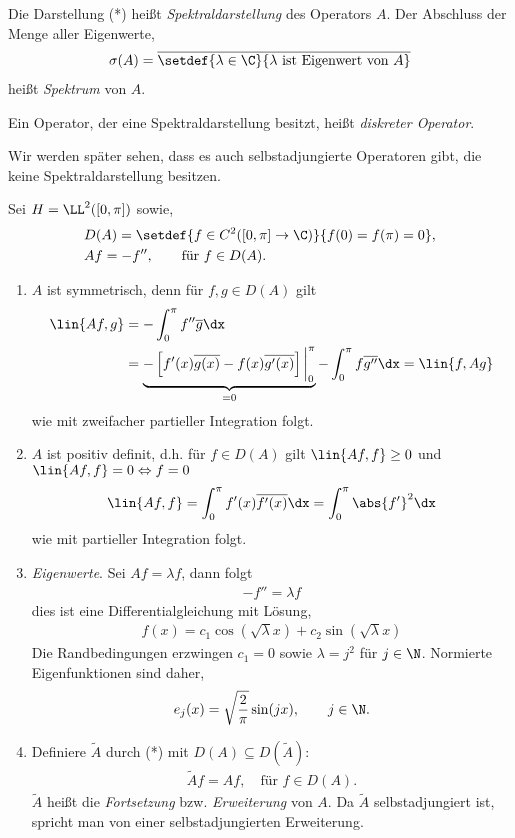 \begin{defn}
\label{defn:1.17}
Die Darstellung (*) heißt \emph{Spektraldarstellung} des Operators $A$. Der
Abschluss der Menge aller Eigenwerte,
\begin{align*}
\sigma(A) = \overline{\setdef{\lambda\in\C}{\lambda\text{ ist Eigenwert von }A}}
\end{align*}
heißt \emph{Spektrum} von $A$.

Ein Operator, der eine Spektraldarstellung besitzt, heißt \emph{diskreter
Operator}.\fishhere
\end{defn}

Wir werden später sehen, dass es auch selbstadjungierte Operatoren gibt, die
keine Spektraldarstellung besitzen.

\begin{bsp}
\label{bsp:1.18}
Sei $H=\LL^2([0,\pi])$ sowie,
\begin{align*}
&D(A) = \setdef{f\in C^2([0,\pi]\to\C)}{f(0) = f(\pi) = 0},\\
&Af = -f'',\qquad \text{für } f\in D(A).
\end{align*}
\begin{enumerate}[label=\arabic{*}.)]
  \item $A$ ist symmetrisch, denn für $f,g\in D(A)$ gilt
\begin{align*}
\lin{Af,g} &= -\int_0^\pi f''\overline{g} \dx\\
&= \underbrace{-\left[ f'(x)\overline{g(x)} - f(x)\overline{g'(x)}
\right]\bigg|_0^\pi}_{=0} -\int_0^\pi f\overline{g''} \dx
= \lin{f,Ag}
\end{align*}
wie mit zweifacher partieller Integration folgt.
\item $A$ ist positiv definit, d.h. für $f\in D(A)$ gilt $\lin{Af,f} \ge 0$
und $\lin{Af,f} = 0 \Leftrightarrow f=0$
\begin{align*}
\lin{Af,f} = \int_0^\pi f'(x)\overline{f'(x)}\dx = \int_0^\pi \abs{f'}^2\dx
\end{align*}
wie mit partieller Integration folgt.
\item \textit{Eigenwerte}. Sei $Af = \lambda f$, dann folgt
\begin{align*}
-f'' = \lambda f
\end{align*}
dies ist eine Differentialgleichung mit Lösung,
\begin{align*}
f(x) = c_1 \cos\left(\sqrt{\lambda}x\right) + c_2
\sin\left(\sqrt{\lambda}x\right)
\end{align*}
Die Randbedingungen erzwingen $c_1 = 0$ sowie
$\lambda = j^2$ für $j\in\N$. Normierte Eigenfunktionen sind daher,
\begin{align*}
e_j(x) = \sqrt{\frac{2}{\pi}}\sin(jx),\qquad j\in\N.
\end{align*}
\item Definiere $\tilde{A}$ durch (*) mit $D(A)\subseteq D(\tilde{A})$:
\begin{align*}
\tilde{A}f = Af,\quad \text{für } f\in D(A).
\end{align*}
$\tilde{A}$ heißt die \emph{Fortsetzung} bzw. \emph{Erweiterung} von $A$. Da
$\tilde{A}$ selbstadjungiert ist, spricht man von einer selbstadjungierten
Erweiterung.


\end{enumerate}
\end{bsp}
